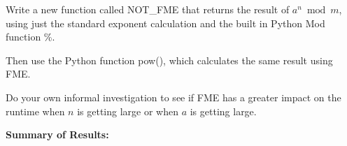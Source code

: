 \documentclass{article}
\begin{document}
\bigbreak

Write a new function called NOT\_FME that returns the result of $a^n \bmod m$, using just the standard exponent calculation and the built in Python Mod function \%.

\bigbreak

Then use the Python function pow(), which calculates the same result using FME.

\bigbreak

Do your own informal investigation to see if FME has a greater impact on the runtime when $n$ is getting large or when $a$ is getting large.

\bigbreak

\textbf{Summary of Results:}

\bigbreak
\end{document}
